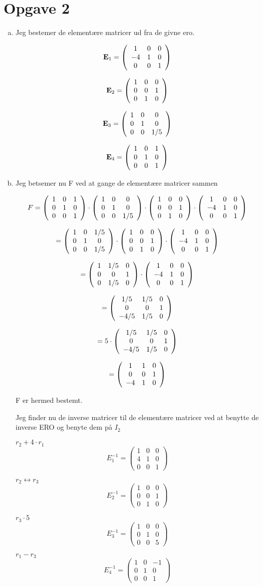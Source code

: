 \documentclass[12pt]{article}
\begin{document}
\section{Opgave 2}
\begin{enumerate}[(a)]
  \item Jeg bestemer de elementære matricer ud fra de givne ero.

$$\mathbf E_{1} =  \Eone $$

$$\mathbf E_{2} = \Etwo $$

$$\mathbf E_{3} = \Ethree $$

$$\mathbf E_{4} = \Efour $$

\item
Jeg betsemer nu F ved at gange de elementære matricer sammen

$$ F = \Efour \cdot \Ethree \cdot \Etwo \cdot \Eone $$

$$ = \fourXthree \cdot \Etwo \cdot \Eone$$

$$ = \fourXthreeXtwo \cdot \Eone$$

$$ = \fourXthreeXtwoXone$$

$$ = 5 \cdot \fourXthreeXtwoXone$$

$$ = \fiveXfourXthreeXtwoXone$$

F er hermed bestemt.

Jeg finder nu de inverse matricer til de elementære matricer ved at benytte de
inverse ERO og benyte dem på $I_{2}$


$r_{2} + 4\cdot r_{1} $ $$E_{1}^{-1} = \left(\begin{array}{ccc}
1&0&0
\\
4&1&0
\\
0&0&1
\end{array}\right) $$
  
$ r_{2} \leftrightarrow r_{3} $ $$ E_{2}^{-1} = \left(\begin{array}{ccc}
1&0&0
\\
0&0&1
\\
0&1&0
\end{array}\right) $$

$ r_{3} \cdot 5 $ $$ E_{3}^{-1} = \left(\begin{array}{ccc}
1&0&0
\\
0&1&0
\\
0&0&5
\end{array}\right) $$

$ r_{1} - r_{3}$ $$ E_{4}^{-1} = \left(\begin{array}{ccc}
1&0&-1
\\
0&1&0
\\
0&0&1
\end{array}\right) $$


\end{enumerate}
\end{document}
